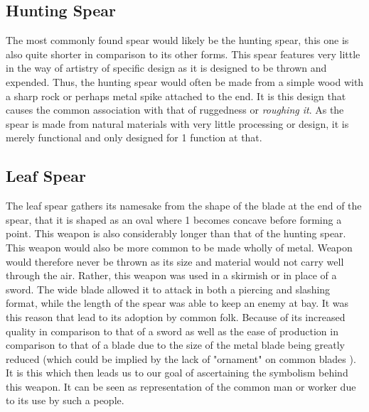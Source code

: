 \documentclass{article}
\begin{document}
\subsection*{Hunting Spear} \label{huntingSpearSymbol}
The most commonly found spear would likely be the hunting spear, this one is also quite shorter in comparison to its other forms. This spear features very little in the way of artistry of specific design as it is designed to be thrown and expended. Thus, the hunting spear would often be made from a simple wood with a sharp rock or perhaps metal spike attached to the end. It is this design that causes the common association with that of ruggedness or \textit{roughing it}. As the spear is made from natural materials with very little processing or design, it is merely functional and only designed for 1 function at that.

\subsection*{Leaf Spear} \label{leafSpearSymbol}
The leaf spear gathers its namesake from the shape of the blade at the end of the spear, that it is shaped as an oval where 1 becomes concave before forming a point. This weapon is also considerably longer than that of the hunting spear. This weapon would also be more common to be made wholly of metal. Weapon would therefore never be thrown as its size and material would not carry well through the air. Rather, this weapon was used in a skirmish or in place of a sword. The wide blade allowed it to attack in both a piercing and slashing format, while the length of the spear was able to keep an enemy at bay. It was this reason that lead to its adoption by common folk. Because of its increased quality in comparison to that of a sword as well as the ease of production in comparison to that of a blade due to the size of the metal blade being greatly reduced (which could be implied by the lack of "ornament" on common blades \parencite{coffey1893notes}). It is this which then leads us to our goal of ascertaining the symbolism behind this weapon. It can be seen as representation of the common man or worker due to its use by such a people.
\end{document}
